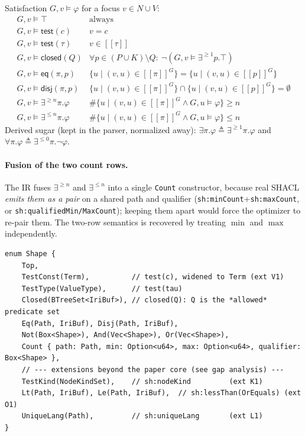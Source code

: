 \documentclass[11pt]{article}
\newcommand{\sem}[1]{[\![#1]\!]}                 %
\newcommand{\semG}[1]{\sem{#1}^{G}}              %
\newcommand{\Node}{N}
\newcommand{\Val}{V}
\newcommand{\Pred}{P}
\newcommand{\Key}{K}
\newcommand{\conf}{\models}                       %
\newcommand{\test}{\mathsf{test}}
\newcommand{\closedc}{\mathsf{closed}}
\newcommand{\eqc}{\mathsf{eq}}
\newcommand{\disjc}{\mathsf{disj}}
\newcommand{\code}[1]{\texttt{#1}}
\theoremstyle{definition}
\begin{document}
\noindent Satisfaction $G,v\conf\varphi$ for a focus $v\in\Node\cup\Val$:
\[
\begin{array}{ll}
G,v\conf\top & \text{always}\\
G,v\conf\test(c) & v=c\\
G,v\conf\test(\tau) & v\in\sem{\tau}\\
G,v\conf\closedc(Q) & \forall p\in(\Pred\cup\Key)\setminus Q:\ \neg(G,v\conf\exists^{\geq1}p.\top)\\
G,v\conf\eqc(\pi,p) & \{u\mid(v,u)\in\semG{\pi}\} = \{u\mid(v,u)\in\semG{p}\}\\
G,v\conf\disjc(\pi,p) & \{u\mid(v,u)\in\semG{\pi}\} \cap \{u\mid(v,u)\in\semG{p}\} = \emptyset\\
G,v\conf\exists^{\geq n}\pi.\varphi & \#\{u\mid(v,u)\in\semG{\pi}\wedge G,u\conf\varphi\}\geq n\\
G,v\conf\exists^{\leq n}\pi.\varphi & \#\{u\mid(v,u)\in\semG{\pi}\wedge G,u\conf\varphi\}\leq n
\end{array}
\]
Derived sugar (kept in the parser, normalized away):
$\exists\pi.\varphi \triangleq \exists^{\geq1}\pi.\varphi$ and
$\forall\pi.\varphi \triangleq \exists^{\leq0}\pi.\neg\varphi$.

\paragraph{Fusion of the two count rows.} The IR fuses $\exists^{\geq n}$ and
$\exists^{\leq n}$ into a single \code{Count} constructor, because real SHACL
\emph{emits them as a pair} on a shared path and qualifier
(\code{sh:minCount}+\code{sh:maxCount}, or
\code{sh:qualifiedMin/MaxCount}); keeping them apart would force the optimizer to
re-pair them. The two-row semantics is recovered by treating $\min$ and $\max$
independently.
\begin{lstlisting}
enum Shape {
    Top,
    TestConst(Term),          // test(c), widened to Term (ext V1)
    TestType(ValueType),      // test(tau)
    Closed(BTreeSet<IriBuf>), // closed(Q): Q is the *allowed* predicate set
    Eq(Path, IriBuf), Disj(Path, IriBuf),
    Not(Box<Shape>), And(Vec<Shape>), Or(Vec<Shape>),
    Count { path: Path, min: Option<u64>, max: Option<u64>, qualifier: Box<Shape> },
    // --- extensions beyond the paper core (see gap analysis) ---
    TestKind(NodeKindSet),    // sh:nodeKind         (ext K1)
    Lt(Path, IriBuf), Le(Path, IriBuf),  // sh:lessThan(OrEquals) (ext O1)
    UniqueLang(Path),         // sh:uniqueLang       (ext L1)
}
\end{lstlisting}
\end{document}
